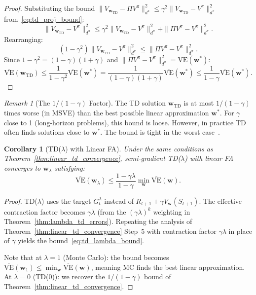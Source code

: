 \documentclass[11pt,a4paper]{article}
\theoremstyle{definition}
\theoremstyle{plain}
\newtheorem{corollary}[theorem]{Corollary}
\theoremstyle{remark}
\newtheorem{remark}{Remark}[section]
\begin{document}
\begin{proof}
Substituting the bound $\|V_{\bm{w}_{\text{TD}}} - \Pi V^\pi\|_{d^\pi}^2 \leq \gamma^2\|V_{\bm{w}_{\text{TD}}} - V^\pi\|_{d^\pi}^2$ from~\eqref{eq:td_proj_bound}:
\begin{equation}
    \|V_{\bm{w}_{\text{TD}}} - V^\pi\|_{d^\pi}^2
    \leq \gamma^2\|V_{\bm{w}_{\text{TD}}} - V^\pi\|_{d^\pi}^2 + \|\Pi V^\pi - V^\pi\|_{d^\pi}^2.
\end{equation}
Rearranging:
\begin{equation}
    (1-\gamma^2)\|V_{\bm{w}_{\text{TD}}} - V^\pi\|_{d^\pi}^2 \leq \|\Pi V^\pi - V^\pi\|_{d^\pi}^2.
    \label{eq:ve_tight_step}
\end{equation}
Since $1-\gamma^2 = (1-\gamma)(1+\gamma)$ and $\|\Pi V^\pi - V^\pi\|_{d^\pi}^2 = \overline{\text{VE}}(\bm{w}^*)$:
\begin{equation}
    \overline{\text{VE}}(\bm{w}_{\text{TD}}) \leq \frac{1}{1-\gamma^2}\overline{\text{VE}}(\bm{w}^*) = \frac{1}{(1-\gamma)(1+\gamma)}\overline{\text{VE}}(\bm{w}^*) \leq \frac{1}{1-\gamma}\overline{\text{VE}}(\bm{w}^*).
    \label{eq:ve_bound_tight}
\end{equation}
\end{proof}

\begin{remark}[The $1/(1-\gamma)$ Factor]
\label{rem:gamma_factor}
The TD solution $\bm{w}_{\text{TD}}$ is at most $1/(1-\gamma)$ times worse (in MSVE) than the best possible linear approximation $\bm{w}^*$. For $\gamma$ close to 1 (long-horizon problems), this bound is loose. However, in practice TD often finds solutions close to $\bm{w}^*$. The bound is tight in the worst case~\cite{tsitsiklis1997}.
\end{remark}

\begin{corollary}[TD($\lambda$) with Linear FA]
\label{cor:td_lambda_linear}
Under the same conditions as Theorem~\ref{thm:linear_td_convergence}, semi-gradient TD($\lambda$) with linear FA converges to $\bm{w}_\lambda$ satisfying:
\begin{equation}
    \overline{\text{VE}}(\bm{w}_\lambda) \leq \frac{1-\gamma\lambda}{1-\gamma}\min_{\bm{w}} \overline{\text{VE}}(\bm{w}).
    \label{eq:td_lambda_bound}
\end{equation}
\end{corollary}

\begin{proof}
TD($\lambda$) uses the target $G_t^\lambda$ instead of $R_{t+1} + \gamma V_{\bm{w}}(S_{t+1})$. The effective contraction factor becomes $\gamma\lambda$ (from the $(\gamma\lambda)^k$ weighting in Theorem~\ref{thm:lambda_td_errors}). Repeating the analysis of Theorem~\ref{thm:linear_td_convergence} Step~5 with contraction factor $\gamma\lambda$ in place of $\gamma$ yields the bound~\eqref{eq:td_lambda_bound}.

Note that at $\lambda = 1$ (Monte Carlo): the bound becomes $\overline{\text{VE}}(\bm{w}_1) \leq \min_{\bm{w}} \overline{\text{VE}}(\bm{w})$, meaning MC finds the best linear approximation. At $\lambda = 0$ (TD(0)): we recover the $1/(1-\gamma)$ bound of Theorem~\ref{thm:linear_td_convergence}.
\end{proof}
\end{document}
